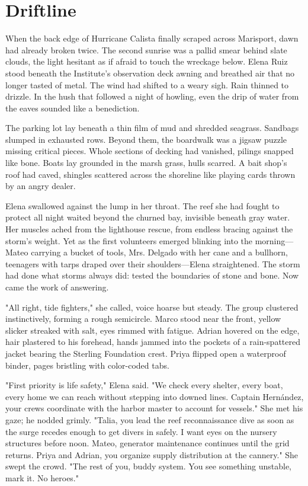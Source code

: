 \chapter{Driftline}

When the back edge of Hurricane Calista finally scraped across Marisport, dawn had already broken twice. The second sunrise was a pallid smear behind slate clouds, the light hesitant as if afraid to touch the wreckage below. Elena Ruiz stood beneath the Institute's observation deck awning and breathed air that no longer tasted of metal. The wind had shifted to a weary sigh. Rain thinned to drizzle. In the hush that followed a night of howling, even the drip of water from the eaves sounded like a benediction.

The parking lot lay beneath a thin film of mud and shredded seagrass. Sandbags slumped in exhausted rows. Beyond them, the boardwalk was a jigsaw puzzle missing critical pieces. Whole sections of decking had vanished, pilings snapped like bone. Boats lay grounded in the marsh grass, hulls scarred. A bait shop's roof had caved, shingles scattered across the shoreline like playing cards thrown by an angry dealer.

Elena swallowed against the lump in her throat. The reef she had fought to protect all night waited beyond the churned bay, invisible beneath gray water. Her muscles ached from the lighthouse rescue, from endless bracing against the storm's weight. Yet as the first volunteers emerged blinking into the morning—Mateo carrying a bucket of tools, Mrs. Delgado with her cane and a bullhorn, teenagers with tarps draped over their shoulders—Elena straightened. The storm had done what storms always did: tested the boundaries of stone and bone. Now came the work of answering.

"All right, tide fighters," she called, voice hoarse but steady. The group clustered instinctively, forming a rough semicircle. Marco stood near the front, yellow slicker streaked with salt, eyes rimmed with fatigue. Adrian hovered on the edge, hair plastered to his forehead, hands jammed into the pockets of a rain-spattered jacket bearing the Sterling Foundation crest. Priya flipped open a waterproof binder, pages bristling with color-coded tabs.

"First priority is life safety," Elena said. "We check every shelter, every boat, every home we can reach without stepping into downed lines. Captain Hernández, your crews coordinate with the harbor master to account for vessels." She met his gaze; he nodded grimly. "Talia, you lead the reef reconnaissance dive as soon as the surge recedes enough to get divers in safely. I want eyes on the nursery structures before noon. Mateo, generator maintenance continues until the grid returns. Priya and Adrian, you organize supply distribution at the cannery." She swept the crowd. "The rest of you, buddy system. You see something unstable, mark it. No heroes."

